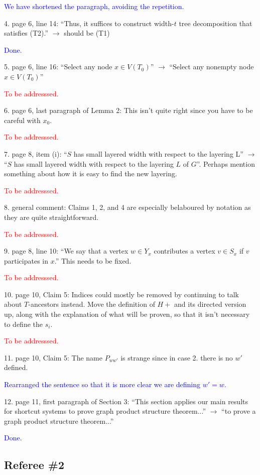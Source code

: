 \documentclass[12pt]{article}
\newcommand{\done}{\textcolor{blue}{Done.}}
\newcommand{\tba}{\textcolor{red}{To be addresssed.}}
\begin{document}
\textcolor{blue}{We have shortened the paragraph, avoiding the repetition.}

4. page 6, line 14: ``Thus, it suffices to construct width-$t$ tree decomposition that satisfies (T2).'' $\longrightarrow$ should be (T1)

\done

5. page 6, line 16: ``Select any node $x \in V (T_0)$'' $\longrightarrow$ ``Select any nonempty node $x \in V (T_0)$''

\tba

6. page 6, last paragraph of Lemma 2: This isn’t quite right since you
have to be careful with $x_0$.

\tba

7. page 8, item (i): ``$S$ has small layered width with respect to the layering
L'' $\longrightarrow$ ``$S$ has small layered width with respect to the layering $L$ of
$G$''. Perhaps mention something about how it is easy to find the new layering.

\tba

8. general comment: Claims 1, 2, and 4 are especially belaboured by
notation as they are quite straightforward.

\tba

9. page 8, line 10: ``We say that a vertex $w \in Y_x$ contributes a vertex
$v \in S_x$ if $v$ participates in $x$.'' This needs to be fixed.

\tba

10. page 10, Claim 5: Indices could mostly be removed by continuing
to talk about $T$-ancestors instead. Move the definition of $H+$ and its
directed version up, along with the explanation of what will be proven,
so that it isn’t necessary to define the $s_i$.

\tba

11. page 10, Claim 5: The name $P_{ww'}$ is strange since in case 2. there is
no $w'$ defined.

\textcolor{blue}{Rearranged the sentence so that it is more clear we are defining $w'=w$. }

12. page 11, first paragraph of Section 3: ``This section applies our main results for shortcut systems to prove graph product structure theorem...'' $\longrightarrow$ ``to prove a graph product structure theorem...''

\done

\subsection*{Referee \#2}
\end{document}
